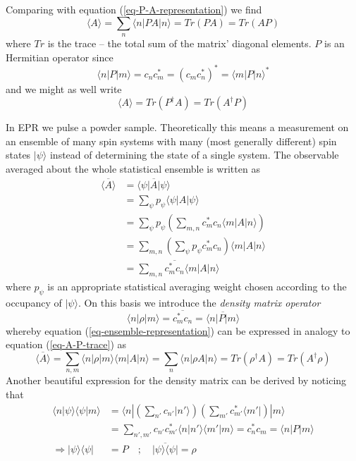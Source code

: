 \documentclass[11.5pt,a4paper]{article}
\begin{document}
Comparing with equation (\ref{eq-P-A-representation}) we find
\begin{equation}
 \langle A \rangle = \sum_n \langle n | P A | n \rangle = Tr(P A) = Tr(A P)
 \label{eq-A-P-trace}
\end{equation}
where $Tr$ is the trace -- the total sum of the matrix' diagonal elements.
$P$ is an Hermitian operator since
\begin{equation}
 \langle n|P|m\rangle = c_n c_m^* = (c_m c_n^*)^* = \langle m |P|n\rangle^*
\end{equation}
and we might as well write
\begin{equation}
 \langle A \rangle = Tr(P^\dagger A) = Tr(A^\dagger P)
\label{eq-rho-observable}
\end{equation}

In EPR we pulse a powder sample. Theoretically this means a measurement on an ensemble of many spin systems with many (most generally different) spin states $|\psi\rangle$ instead of determining the state of a single system. The observable averaged about the whole statistical ensemble is written as
\begin{align}
 \overline{\langle A \rangle} & = \overline{\langle \psi | A | \psi \rangle} \\
  & = \sum_\psi p_\psi \langle \psi | A | \psi \rangle \\ 
  & = \sum_\psi p_\psi \left( \sum_{m,n} c_m^* c_n \langle m | A | n \rangle \right) \\
  & = \sum_{m,n} \left( \sum_\psi p_\psi c_m^* c_n \right) \langle m | A | n \rangle \\
  & = \sum_{m,n} \overline{c_m^* c_n} \langle m | A | n \rangle
  \label{eq-ensemble-representation}
\end{align}
where $p_\psi$ is an appropriate statistical averaging weight chosen according to the occupancy of $|\psi\rangle$. On this basis we introduce the \emph{density matrix operator}
\begin{equation} 
 \langle n | \rho | m \rangle = \overline{c_m^* c_n} = \overline{\langle n | P | m \rangle}
\end{equation}
whereby equation (\ref{eq-ensemble-representation}) can be expressed in analogy to equation (\ref{eq-A-P-trace}) as
\begin{equation}
 \overline{\langle A \rangle} = \sum_{n,m} \langle n | \rho | m \rangle \langle m | A | n \rangle = \sum_{n} \langle n | \rho A | n \rangle = Tr(\rho^\dagger A) = Tr(A^\dagger \rho)
\end{equation}
Another beautiful expression for the density matrix can be derived by noticing that
\begin{align}
 \langle n |\psi \rangle \langle \psi | m \rangle & = \langle n | \left( \sum_{n'} c_{n'} |n' \rangle \right) \left( \sum_{m'} c_{m'}^* \langle m' | \right) | m \rangle \\ & = \sum_{n',m'} c_{n'} c_{m'}^* \langle n | n' \rangle \langle m' | m \rangle = c_n^* c_m  = \langle n | P | m \rangle \\
  \Rightarrow |\psi\rangle\langle\psi| & = P \quad; \quad \overline{|\psi\rangle\langle\psi|}  = \rho
\label{eq-density-matrix}
\end{align}
\end{document}
